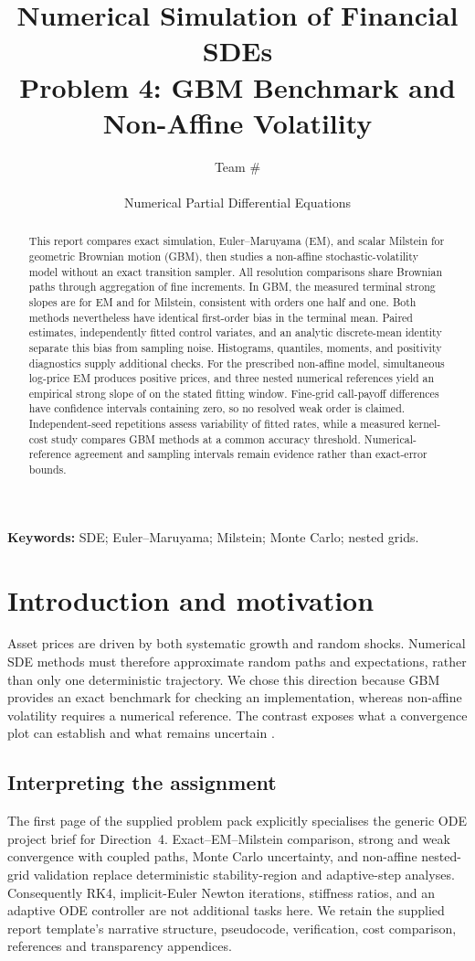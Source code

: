\documentclass[11pt,a4paper]{article}
\title{\textbf{Numerical Simulation of Financial SDEs}\\[2mm]
\large Problem 4: GBM Benchmark and Non-Affine Volatility}
\author{Team \#\TeamNumber\\[2mm]\TeamMembers\\[2mm]
\small Numerical Partial Differential Equations}
\date{\SubmissionDate}
\begin{document}
\maketitle
\begin{abstract}
This report compares exact simulation, Euler--Maruyama (EM), and scalar Milstein for geometric Brownian motion (GBM), then studies a non-affine stochastic-volatility model without an exact transition sampler. All resolution comparisons share Brownian paths through aggregation of fine increments. In GBM, the measured terminal strong slopes are \GBMEMRate{} for EM and \GBMMilRate{} for Milstein, consistent with orders one half and one. Both methods nevertheless have identical first-order bias in the terminal mean. Paired estimates, independently fitted control variates, and an analytic discrete-mean identity separate this bias from sampling noise. Histograms, quantiles, moments, and positivity diagnostics supply additional checks. For the prescribed non-affine model, simultaneous log-price EM produces positive prices, and three nested numerical references yield an empirical strong slope of \NARate{} on the stated fitting window. Fine-grid call-payoff differences have confidence intervals containing zero, so no resolved weak order is claimed. Independent-seed repetitions assess variability of fitted rates, while a measured kernel-cost study compares GBM methods at a common accuracy threshold. Numerical-reference agreement and sampling intervals remain evidence rather than exact-error bounds.
\end{abstract}
\noindent\textbf{Keywords:} SDE; Euler--Maruyama; Milstein; Monte Carlo; nested grids.
\newpage
\tableofcontents
\newpage

\section{Introduction and motivation}\label{sec:introduction}
Asset prices are driven by both systematic growth and random shocks. Numerical SDE methods must therefore approximate random paths and expectations, rather than only one deterministic trajectory. We chose this direction because GBM provides an exact benchmark for checking an implementation, whereas non-affine volatility requires a numerical reference. The contrast exposes what a convergence plot can establish and what remains uncertain \cite{pack,higham,kloeden}.

\subsection{Interpreting the assignment}
The first page of the supplied problem pack explicitly specialises the generic ODE project brief for Direction~4. Exact--EM--Milstein comparison, strong and weak convergence with coupled paths, Monte Carlo uncertainty, and non-affine nested-grid validation replace deterministic stability-region and adaptive-step analyses. Consequently RK4, implicit-Euler Newton iterations, stiffness ratios, and an adaptive ODE controller are not additional tasks here. We retain the supplied report template's narrative structure, pseudocode, verification, cost comparison, references and transparency appendices.
\end{document}
